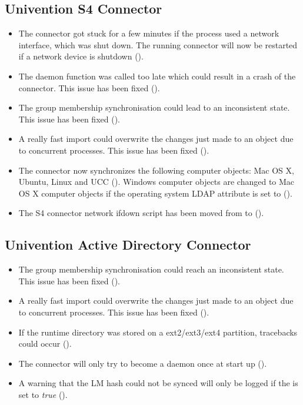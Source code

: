 \subsection{Univention S4 Connector}
\begin{itemize}
\item The connector got stuck for a few minutes if the process used
  a network interface, which was shut down. The running connector will
  now be restarted if a network device is shutdown ().

\item The daemon function was called too late which could result in a
crash of the connector. This issue has been fixed ().

\item The group membership synchronisation could lead to an inconsistent
state. This issue has been fixed ().

\item A really fast import could overwrite the changes just made to an object
due to concurrent processes. This issue has been fixed ().

\item The connector now synchronizes the following computer objects:
 Mac OS X, Ubuntu, Linux and UCC (). Windows computer
 objects are changed to Mac OS X computer objects if the operating
 system LDAP attribute is set to  ().

\item The S4 connector network ifdown script has been moved from
 to 
().

\end{itemize}

\subsection{Univention Active Directory Connector}
\begin{itemize}

\item The group membership synchronisation could reach an inconsistent
state. This issue has been fixed ().

\item A really fast import could overwrite the changes just made to an object
due to concurrent processes. This issue has been fixed ().

\item If the  runtime
  directory was stored on a ext2/ext3/ext4 partition, tracebacks could occur ().

\item The connector will only try to become a daemon once at start up
  ().

\item A warning that the LM hash could not be synced will only be
  logged if the  is set to \emph{true}
  ().
\end{itemize}


